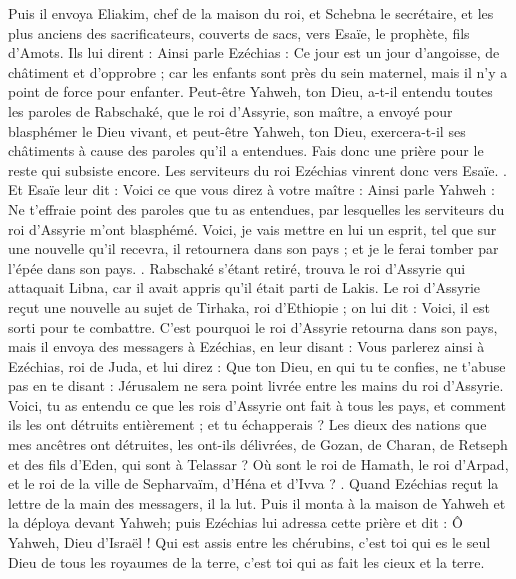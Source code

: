 \begin{multicols}{2}
Puis il envoya Eliakim, chef de la maison du roi, et Schebna le secrétaire, et les plus anciens des sacrificateurs, couverts de sacs, vers Esaïe, le prophète, fils d'Amots.
Ils lui dirent : Ainsi parle Ezéchias : Ce jour est un jour d'angoisse, de châtiment et d'opprobre ; car les enfants sont près du sein maternel, mais il n'y a point de force pour enfanter.
Peut-être Yahweh, ton Dieu, a-t-il entendu toutes les paroles de Rabschaké, que le roi d'Assyrie, son maître, a envoyé pour blasphémer le Dieu vivant, et peut-être Yahweh, ton Dieu, exercera-t-il ses châtiments à cause des paroles qu'il a entendues. Fais donc une prière pour le reste qui subsiste encore.
Les serviteurs du roi Ezéchias vinrent donc vers Esaïe.
.
Et Esaïe leur dit : Voici ce que vous direz à votre maître : Ainsi parle Yahweh : Ne t'effraie point des paroles que tu as entendues, par lesquelles les serviteurs du roi d'Assyrie m'ont blasphémé.
Voici, je vais mettre en lui un esprit, tel que sur une nouvelle qu'il recevra, il retournera dans son pays ; et je le ferai tomber par l'épée dans son pays.
.
Rabschaké s'étant retiré, trouva le roi d'Assyrie qui attaquait Libna, car il avait appris qu'il était parti de Lakis.
Le roi d'Assyrie reçut une nouvelle au sujet de Tirhaka, roi d'Ethiopie ; on lui dit : Voici, il est sorti pour te combattre. C'est pourquoi le roi d'Assyrie retourna dans son pays, mais il envoya des messagers à Ezéchias, en leur disant :
Vous parlerez ainsi à Ezéchias, roi de Juda, et lui direz : Que ton Dieu, en qui tu te confies, ne t'abuse pas en te disant : Jérusalem ne sera point livrée entre les mains du roi d'Assyrie.
Voici, tu as entendu ce que les rois d'Assyrie ont fait à tous les pays, et comment ils les ont détruits entièrement ; et tu échapperais ?
Les dieux des nations que mes ancêtres ont détruites, les ont-ils délivrées, de Gozan, de Charan, de Retseph et des fils d'Eden, qui sont à Telassar ?
Où sont le roi de Hamath, le roi d'Arpad, et le roi de la ville de Sepharvaïm, d'Héna et d'Ivva ?
.
Quand Ezéchias reçut la lettre de la main des messagers, il la lut. Puis il monta à la maison de Yahweh et la déploya devant Yahweh;
puis Ezéchias lui adressa cette prière et dit : Ô Yahweh, Dieu d'Israël ! Qui est assis entre les chérubins, c'est toi qui es le seul Dieu de tous les royaumes de la terre, c'est toi qui as fait les cieux et la terre.

\end{multicols}
